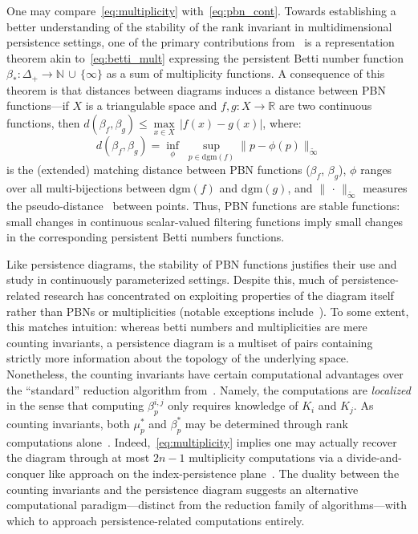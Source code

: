 One may compare~\eqref{eq:multiplicity} with~\eqref{eq:pbn_cont}. Towards establishing a better understanding of the stability of the rank invariant in multidimensional persistence settings, one of the primary contributions from~\cite{cerri2013betti} is a representation theorem akin to~\eqref{eq:betti_mult} expressing the persistent Betti number function $\beta_\ast : \Delta_+ \to \mathbb{N} \, \cup \, \{\infty\}$ as a sum of multiplicity functions. 
A consequence of this theorem is that distances between diagrams induces a distance between PBN functions---if $X$ is a triangulable space and $f,g : X \to \mathbb{R}$ are two continuous functions, then $d(\beta_f, \beta_g) \leq \max\limits_{x \in X} \, \lvert f(x) - g(x) \rvert$, where:
\begin{equation*}\label{eq:pbn_stability}
	d(\beta_f, \beta_g) = \inf\limits_{\phi} \; \sup\limits_{p \in \mathrm{dgm}(f)} \lVert p - \phi(p) \rVert_{\widetilde{\infty} }
\end{equation*}
is the (extended) matching distance between PBN functions ($\beta_f$, $\beta_g$), $\phi$ ranges over all multi-bijections between $\mathrm{dgm}(f)$ and $\mathrm{dgm}(g)$, and $\lVert \,\cdot \, \rVert_{\widetilde{\infty}}$ measures the pseudo-distance~\cite{cerri2013betti} between points.
Thus, PBN functions are stable functions: small changes in continuous scalar-valued filtering functions imply small changes in the corresponding persistent Betti numbers functions. 

Like persistence diagrams, the stability of PBN functions justifies their use and study in continuously parameterized settings. Despite this, much of persistence-related research has concentrated on exploiting properties of the diagram itself~\cite{} rather than PBNs or multiplicities (notable exceptions include~\cite{cerri2013betti, chen2011output}). 
To some extent, this matches intuition: whereas betti numbers and multiplicities are mere counting invariants, a persistence diagram is a multiset of pairs containing strictly more information about the topology of the underlying space. 
Nonetheless, the counting invariants have certain computational advantages over the ``standard'' reduction algorithm from~\cite{edelsbrunner2022computational}. 
Namely, the computations are \emph{localized} in the sense that computing $\beta_p^{i,j}$ only requires knowledge of $K_i$ and $K_j$. As counting invariants, both $\mu_p^\ast$ and $\beta_p^{\ast}$ may be determined through rank computations alone~\cite{zomorodian2004computing}. 
Indeed,~\eqref{eq:multiplicity} implies one may actually recover the diagram through at most $2n-1$ multiplicity computations via a divide-and-conquer like approach on the index-persistence plane~\cite{chen2011output}. The duality between the counting invariants and the persistence diagram suggests an alternative computational paradigm---distinct from the reduction family of algorithms---with which to approach persistence-related computations entirely. 

